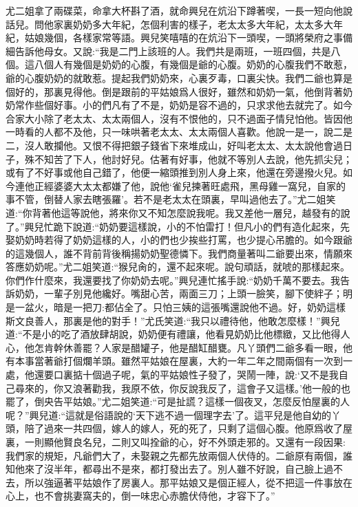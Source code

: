 \begin{parag}
    尤二姐拿了兩碟菜，命拿大杯斟了酒，就命興兒在炕沿下蹲著喫，一長一短向他說話兒。問他家裏奶奶多大年紀，怎個利害的樣子，老太太多大年紀，太太多大年紀，姑娘幾個，各樣家常等語。興兒笑嘻嘻的在炕沿下一頭喫，一頭將榮府之事備細告訴他母女。又說:“我是二門上該班的人。我們共是兩班，一班四個，共是八個。這八個人有幾個是奶奶的心腹，有幾個是爺的心腹。奶奶的心腹我們不敢惹，爺的心腹奶奶的就敢惹。提起我們奶奶來，心裏歹毒，口裏尖快。我們二爺也算是個好的，那裏見得他。倒是跟前的平姑娘爲人很好，雖然和奶奶一氣，他倒背著奶奶常作些個好事。小的們凡有了不是，奶奶是容不過的，只求求他去就完了。如今合家大小除了老太太、太太兩個人，沒有不恨他的，只不過面子情兒怕他。皆因他一時看的人都不及他，只一味哄著老太太、太太兩個人喜歡。他說一是一，說二是二，沒人敢攔他。又恨不得把銀子錢省下來堆成山，好叫老太太、太太說他會過日子，殊不知苦了下人，他討好兒。估著有好事，他就不等別人去說，他先抓尖兒；或有了不好事或他自己錯了，他便一縮頭推到別人身上來，他還在旁邊撥火兒。如今連他正經婆婆大太太都嫌了他，說他‘雀兒揀著旺處飛，黑母雞一窩兒，自家的事不管，倒替人家去瞎張羅’。若不是老太太在頭裏，早叫過他去了。”尤二姐笑道:“你背著他這等說他，將來你又不知怎麼說我呢。我又差他一層兒，越發有的說了。”興兒忙跪下說道:“奶奶要這樣說，小的不怕雷打！但凡小的們有造化起來，先娶奶奶時若得了奶奶這樣的人，小的們也少挨些打罵，也少提心吊膽的。如今跟爺的這幾個人，誰不背前背後稱揚奶奶聖德憐下。我們商量著叫二爺要出來，情願來答應奶奶呢。”尤二姐笑道:“猴兒肏的，還不起來呢。說句頑話，就唬的那樣起來。你們作什麼來，我還要找了你奶奶去呢。”興兒連忙搖手說:“奶奶千萬不要去。我告訴奶奶，一輩子別見他纔好。嘴甜心苦，兩面三刀；上頭一臉笑，腳下使絆子；明是一盆火，暗是一把刀:都佔全了。只怕三姨的這張嘴還說他不過。好，奶奶這樣斯文良善人，那裏是他的對手！”尤氏笑道:“我只以禮待他，他敢怎麼樣！”興兒道:“不是小的吃了酒放肆胡說，奶奶便有禮讓，他看見奶奶比他標緻，又比他得人心，他怎肯幹休善罷？人家是醋罐子，他是醋缸醋甕。凡丫頭們二爺多看一眼，他有本事當著爺打個爛羊頭。雖然平姑娘在屋裏，大約一年二年之間兩個有一次到一處，他還要口裏掂十個過子呢，氣的平姑娘性子發了，哭鬧一陣，說:‘又不是我自己尋來的，你又浪著勸我，我原不依，你反說我反了，這會子又這樣。’他一般的也罷了，倒央告平姑娘。”尤二姐笑道:“可是扯謊？這樣一個夜叉，怎麼反怕屋裏的人呢？”興兒道:“這就是俗語說的‘天下逃不過一個理字去’了。這平兒是他自幼的丫頭，陪了過來一共四個，嫁人的嫁人，死的死了，只剩了這個心腹。他原爲收了屋裏，一則顯他賢良名兒，二則又叫拴爺的心，好不外頭走邪的。又還有一段因果:我們家的規矩，凡爺們大了，未娶親之先都先放兩個人伏侍的。二爺原有兩個，誰知他來了沒半年，都尋出不是來，都打發出去了。別人雖不好說，自己臉上過不去，所以強逼著平姑娘作了房裏人。那平姑娘又是個正經人，從不把這一件事放在心上，也不會挑妻窩夫的，倒一味忠心赤膽伏侍他，才容下了。”
\end{parag}


